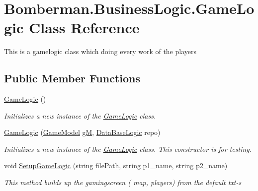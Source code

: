 \hypertarget{class_bomberman_1_1_business_logic_1_1_game_logic}{}\section{Bomberman.\+Business\+Logic.\+Game\+Logic Class Reference}
\label{class_bomberman_1_1_business_logic_1_1_game_logic}


This is a gamelogic class which doing every work of the players  


\subsection*{Public Member Functions}
\begin{DoxyCompactItemize}
\item 
\mbox{\hyperlink{class_bomberman_1_1_business_logic_1_1_game_logic_a14787126f329ddf18b91fb37caac1eee}{Game\+Logic}} ()
\begin{DoxyCompactList}\small\item\em Initializes a new instance of the \mbox{\hyperlink{class_bomberman_1_1_business_logic_1_1_game_logic}{Game\+Logic}} class. \end{DoxyCompactList}\item 
\mbox{\hyperlink{class_bomberman_1_1_business_logic_1_1_game_logic_a4f8cd01b5a5e15e22bdcd912b539aee9}{Game\+Logic}} (\mbox{\hyperlink{class_bomberman_1_1_business_logic_1_1_game_model}{Game\+Model}} \mbox{\hyperlink{class_bomberman_1_1_business_logic_1_1_game_logic_abde3e754422fcaffa997b571fb9e7010}{gM}}, \mbox{\hyperlink{class_bomberman_1_1_business_logic_1_1_data_base_logic}{Data\+Base\+Logic}} repo)
\begin{DoxyCompactList}\small\item\em Initializes a new instance of the \mbox{\hyperlink{class_bomberman_1_1_business_logic_1_1_game_logic}{Game\+Logic}} class. This constructor is for testing. \end{DoxyCompactList}\item 
void \mbox{\hyperlink{class_bomberman_1_1_business_logic_1_1_game_logic_a1f2f37aca7ccda0825d68f75bbf5fb3d}{Setup\+Game\+Logic}} (string file\+Path, string p1\+\_\+name, string p2\+\_\+name)
\begin{DoxyCompactList}\small\item\em This method builds up the gamingscreen ( map, players) from the default txt-\/s \end{DoxyCompactList}\item 

\end{DoxyCompactItemize}
